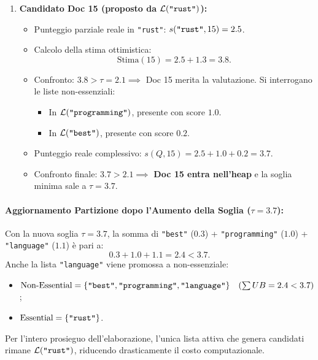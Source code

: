 \begin{enumerate}
\begin{itemize}
        \item \textit{Nota sul Doc 12:} Si osservi che Doc 12 \`e stato scavalcato a monte senza essere mai preso in considerazione, poich\'e non compariva in alcuna lista essenziale.
    \end{itemize}
    \item \textbf{Candidato Doc 15 (proposto da $\mathcal{L}(\text{\texttt{"rust"}})$):}
    \begin{itemize}
        \item Punteggio parziale reale in \texttt{"rust"}: $s(\text{\texttt{"rust"}}, 15) = 2.5$.
        \item Calcolo della stima ottimistica:
        \begin{equation*}
            \text{Stima}(15) = 2.5 + 1.3 = 3.8.
        \end{equation*}
        \item Confronto: $3.8 > \tau = 2.1 \implies$ Doc 15 merita la valutazione. Si interrogano le liste non-essenziali:
        \begin{itemize}
            \item In $\mathcal{L}(\text{\texttt{"programming"}})$, presente con score $1.0$.
            \item In $\mathcal{L}(\text{\texttt{"best"}})$, presente con score $0.2$.
        \end{itemize}
        \item Punteggio reale complessivo: $s(Q, 15) = 2.5 + 1.0 + 0.2 = 3.7$.
        \item Confronto finale: $3.7 > 2.1 \implies$ \textbf{Doc 15 entra nell'heap} e la soglia minima sale a $\tau = 3.7$.
    \end{itemize}
\end{enumerate}

\paragraph{Aggiornamento Partizione dopo l'Aumento della Soglia ($\tau = 3.7$):}
Con la nuova soglia $\tau = 3.7$, la somma di \texttt{"best"} ($0.3$) + \texttt{"programming"} ($1.0$) + \texttt{"language"} ($1.1$) \`e pari a:
\begin{equation*}
    0.3 + 1.0 + 1.1 = 2.4 < 3.7.
\end{equation*}
Anche la lista \texttt{"language"} viene promossa a non-essenziale:
\begin{itemize}
    \item $\text{Non-Essential} = \{\text{\texttt{"best"}}, \text{\texttt{"programming"}}, \text{\texttt{"language"}}\} \quad (\sum UB = 2.4 < 3.7)$;
    \item $\text{Essential} = \{\text{\texttt{"rust"}}\}$.
\end{itemize}
Per l'intero prosieguo dell'elaborazione, l'unica lista attiva che genera candidati rimane $\mathcal{L}(\text{\texttt{"rust"}})$, riducendo drasticamente il costo computazionale.

